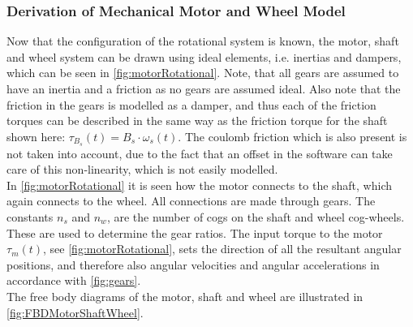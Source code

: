 \subsubsection{Derivation of Mechanical Motor and Wheel Model}
\vspace{0.3 cm}
Now that the configuration of the rotational system is known, the motor, shaft and wheel system can be drawn using ideal elements, i.e. inertias and dampers, which can be seen in \autoref{fig:motorRotational}. Note, that all gears are assumed to have an inertia and a friction as no gears are assumed ideal. Also note that the friction in the gears is modelled as a damper, and thus each of the friction torques can be described in the same way as the friction torque for the shaft shown here: $\tau_{B_s}(t) = B_s \cdot \omega_s(t)$. The coulomb friction which is also present is not taken into account, due to the fact that an offset in the software can take care of this non-linearity, which is not easily modelled.\\
\clearpage
In \autoref{fig:motorRotational} it is seen how the motor connects to the shaft, which again connects to the wheel. All connections are made through gears. The constants $n_s$ and $n_w$, are the number of cogs on the shaft and wheel cog-wheels. These are used to determine the gear ratios.\newpar
The input torque to the motor $\tau_m(t)$, see \autoref{fig:motorRotational}, sets the direction of all the resultant angular positions, and therefore also angular velocities and angular accelerations in accordance with \autoref{fig:gears}.\\
The free body diagrams of the motor, shaft and wheel are illustrated in \autoref{fig:FBDMotorShaftWheel}. %
